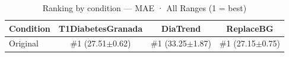 \begin{table}[htbp]
\centering
\small
\caption{Ranking by condition — MAE · All Ranges  (1 = best)}
\label{tab:ranking_mae_entire_family_mechanism_baseline}
\begin{tabular}{lccc}
\toprule
\textbf{Condition} & \textbf{T1DiabetesGranada} & \textbf{DiaTrend} & \textbf{ReplaceBG} \\
\midrule
Original & \#1 (27.51$\pm$0.62) & \#1 (33.25$\pm$1.87) & \#1 (27.15$\pm$0.75) \\
\bottomrule
\end{tabular}
\end{table}